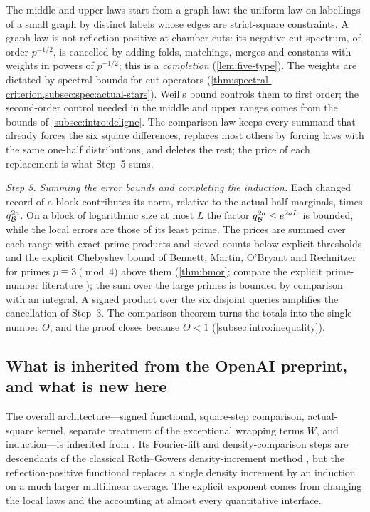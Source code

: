 The middle and upper laws start from a graph law: the uniform law on
labellings of a small graph by distinct labels whose edges are
strict-square constraints. A graph law is not reflection positive at
chamber cuts: its negative cut spectrum, of order $p^{-1/2}$, is
cancelled by adding folds, matchings, merges and constants with weights
in powers of $p^{-1/2}$; this is a \emph{completion}
(\cref{lem:five-type}). The weights are dictated by spectral bounds for
cut operators (\cref{thm:spectral-criterion,subsec:spec:actual-stars}).
Weil's bound controls them
to first order; the second-order control needed in the middle and upper
ranges comes from the bounds of \cref{subsec:intro:deligne}. The
comparison law keeps every summand that already forces the six
square differences, replaces most others by forcing laws with the
same one-half distributions, and deletes the rest; the price of
each replacement is what Step~5 sums.

\emph{Step 5. Summing the error bounds and completing the induction.}
Each changed record of a block contributes its norm, relative to the
actual half marginals, times $q_{\mathcal B}^{2a}$. On a block of logarithmic
size at most $L$ the factor $q_{\mathcal B}^{2a}\le e^{2aL}$ is bounded, while
the local errors are those of its least prime. The prices are summed
over each range with exact prime products and sieved counts below
explicit thresholds and the explicit Chebyshev bound of Bennett, Martin,
O'Bryant and Rechnitzer for primes $p\equiv3\pmod4$ above them
(\cref{thm:bmor}; compare the explicit prime-number literature
\cite{RosserSchoenfeld75,PlattTrudgian21}); the sum over the large
primes is bounded by comparison with an integral. A
signed product over the six disjoint queries amplifies the cancellation
of Step~3. The comparison theorem turns the totals into the single number
$\Theta$, and the proof closes because $\Theta<1$
(\cref{subsec:intro:inequality}).

\subsection{What is inherited from the OpenAI preprint, and what is new here}
\label{subsec:intro:new}

The overall architecture---signed functional, square-step comparison,
actual-square kernel, separate treatment of the exceptional
wrapping terms $W$, and induction---is inherited
from \cite{OpenAI}. Its Fourier-lift and density-comparison steps are
descendants of the classical Roth--Gowers density-increment method
\cite{Roth53,Bourgain99,Gowers01,Sanders11,TaoVu06}, but the
reflection-positive functional replaces a single density increment by
an induction on a much larger multilinear average. The explicit
exponent comes from changing the local laws and the accounting at
almost every quantitative interface.

